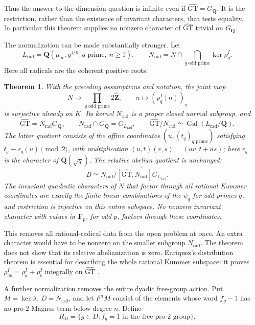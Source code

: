 \documentclass[11pt,a4paper]{article}
\newtheorem{theorem}{Theorem}[section]
\theoremstyle{definition}
\theoremstyle{remark}
\newcommand{\GT}{\widehat{\mathrm{GT}}}
\newcommand{\Zh}{\widehat{\mathbf Z}}
\newcommand{\Q}{\mathbf Q}
\newcommand{\F}{\mathbf F}
\newcommand{\GQ}{G_{\Q}}
\DeclareMathOperator{\Gal}{Gal}
\begin{document}
Thus the answer to the dimension question is infinite even if $\GT=\GQ$. It is the restriction, rather than the existence of invariant characters, that tests equality. In particular this theorem supplies no nonzero character of $\GT$ trivial on $\GQ$.







The normalization can be made substantially stronger. Let
\[
 L_{\mathrm{rad}}=\Q(\mu_\infty,q^{1/n}:q\text{ prime},\ n\geq1),
 \qquad
 N_{\mathrm{rad}}=N\cap\bigcap_{q\text{ odd prime}}\ker\rho_q^I.
\]
Here all radicals are the coherent positive roots.

\begin{theorem}\label{thm:main-rational-normalization}
With the preceding assumptions and notation, the joint map
\[
 N\longrightarrow\prod_{q\text{ odd prime}}2\Zh,
 \qquad n\longmapsto(\rho_q^I(n))_q
\]
is surjective already on $K$. Its kernel $N_{\mathrm{rad}}$ is
a proper closed normal subgroup, and
\[
 \GT=N_{\mathrm{rad}}\GQ,\qquad
 N_{\mathrm{rad}}\cap\GQ=G_{L_{\mathrm{rad}}},\qquad
 \GT/N_{\mathrm{rad}}\simeq\Gal(L_{\mathrm{rad}}/\Q).
\]
The latter quotient consists of the affine coordinates
$(u,(t_q)_{q\text{ prime}})$ satisfying
$t_q\equiv\epsilon_q(u)\pmod2$, with multiplication
$(u,t)(v,s)=(uv,t+us)$; here $\epsilon_q$ is the character of
$\Q(\sqrt q)$. The relative abelian quotient is unchanged:
\[
 B\simeq N_{\mathrm{rad}}/
       \overline{[\GT,N_{\mathrm{rad}}]G_{L_{\mathrm{rad}}}}.
\]
The invariant quadratic characters of $N$ that factor through all
rational Kummer coordinates are exactly the finite linear combinations
of the $\psi_q$ for odd primes $q$, and restriction is injective on
this entire subspace. No nonzero invariant character with values in
$\F_p$, for odd $p$, factors through these coordinates.
\end{theorem}

This removes all rational-radical data from the open problem at once.
An extra character would have to be nonzero on the smaller subgroup
$N_{\mathrm{rad}}$. The theorem does not show that its relative
abelianization is zero. Enriquez's distribution theorem is essential
for describing the whole rational Kummer subspace: it proves
$\rho_{ab}^I=\rho_a^I+\rho_b^I$ integrally on $\GT$
\cite[Theorem~8.1 and Remark~8.6]{Enriquez2007}.

A further normalization removes the entire dyadic free-group action.
Put $M=\ker\lambda$, $D=N_{\mathrm{rad}}$, and let $F^nM$ consist
of the elements whose word $f_g-1$ has no pro-$2$ Magnus term
below degree $n$. Define
\[
 R_D=\{g\in D:f_g=1\text{ in the free pro-$2$ group}\}.
\]
\end{document}

